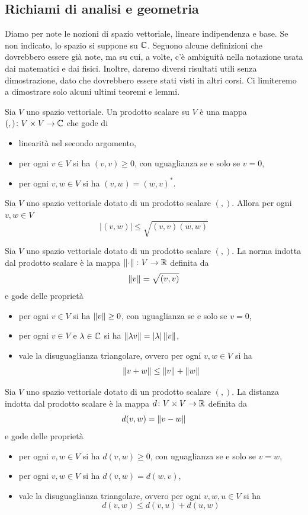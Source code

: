 \documentclass[a4paper, 11pt]{article}
\begin{document}
	\subsection{Richiami di analisi e geometria}
	Diamo per note le nozioni di spazio vettoriale, lineare indipendenza e base. Se non indicato, lo spazio si suppone su $\mathbb{C}$. Seguono alcune definizioni che dovrebbero essere già note, ma su cui, a volte, c'è ambiguità nella notazione usata dai matematici e dai fisici. Inoltre, daremo diversi risultati utili senza dimostrazione, dato che dovrebbero essere stati visti in altri corsi. Ci limiteremo a dimostrare solo alcuni ultimi teoremi e lemmi.
	\begin{definition} Sia $V$ uno spazio vettoriale. Un prodotto scalare su $V$ è una mappa $(,)\colon V\times V\to\mathbb{C}$ che gode di
		\begin{itemize}
			\item linearità nel secondo argomento,
			\item per ogni $v\in V$ si ha $(v,v)\geq0$, con uguaglianza se e solo se $v=0$,
			\item per ogni $v,w\in V$ si ha $(v,w)=(w,v)^*$.
		\end{itemize}
	\end{definition}
	\begin{lemma}
		Sia $V$ uno spazio vettoriale dotato di un prodotto scalare $(,)$. Allora per ogni $v,w\in V$
		\[\left|(v,w)\right|\leq\sqrt{(v,v)(w,w)}\]
	\end{lemma}
	\begin{definition}
		Sia $V$ uno spazio vettoriale dotato di un prodotto scalare $(,)$. La norma indotta dal prodotto scalare è la mappa $\left\Vert\cdot\right\Vert\colon V\to\mathbb{R}$ definita da
		\[\left\Vert v\right\Vert=\sqrt{(v,v)}\]
		e gode delle proprietà
		\begin{itemize}
			\item per ogni $v\in V$ si ha $\left\Vert v\right\Vert\geq0$, con uguaglianza se e solo se $v=0$,
			\item per ogni $v\in V$ e $\lambda\in \mathbb{C}$ si ha $\left\Vert\lambda v\right\Vert=|\lambda|\left\Vert v\right\Vert$,
			\item vale la disuguaglianza triangolare, ovvero per ogni $v,w\in V$ si ha
			\[\left\Vert v+w\right\Vert\leq\left\Vert v\right\Vert+\left\Vert w\right\Vert\]
		\end{itemize}
	\end{definition}
	\begin{definition}
		Sia $V$ uno spazio vettoriale dotato di un prodotto scalare $(,)$. La distanza indotta dal prodotto scalare è
		la mappa $d\colon V\times V\to \mathbb{R}$ definita da
		\[d(v,w)=\left\Vert v-w\right\Vert\]
		e gode delle proprietà
		\begin{itemize}
			\item per ogni $v,w\in V$ si ha $d(v,w)\geq0$, con uguaglianza se e solo se $v=w$,
			\item per ogni $v,w\in V$ si ha $d(v,w)=d(w,v)$,
			\item vale la disuguaglianza triangolare, ovvero per ogni $v,w,u\in V$ si ha
			\[d(v,w)\leq d(v,u)+d(u,w)\] 	
		\end{itemize}
	\end{definition}
\end{document}
